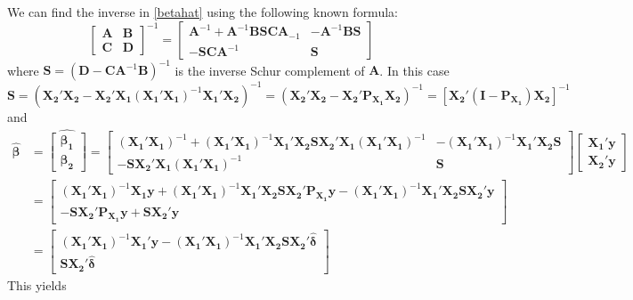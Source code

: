 \documentclass[10pt]{article}
\begin{document}
We can find the inverse in \eqref{betahat} using the following known formula:
\[
\begin{bmatrix} \bm{A} & \bm{B} \\ \bm{C} & \bm{D} \end{bmatrix} ^{-1} =
\begin{bmatrix} \bm{A}^{-1} + \bm{A}^{-1}\bm{B}\bm{S}\bm{C}\bm{A}_{-1}
  & -\bm{A}^{-1}\bm{B}\bm{S} \\
  -\bm{S}\bm{C}\bm{A}^{-1} & \bm{S} \end{bmatrix}
\]
where $\bm{S} = (\bm{D} - \bm{C}\bm{A}^{-1}\bm{B})^{-1}$ is the
inverse Schur complement of $\bm{A}$. In this case
\[
\bm{S} = \left(\bm{X_2}'\bm{X_2} -
  \bm{X_2}'\bm{X_1}(\bm{X_1}'\bm{X_1})^{-1}\bm{X_1}'\bm{X_2}\right)^{-1}
= (\bm{X_2}'\bm{X_2} - \bm{X_2}'\bm{P_{X_1}}\bm{X_2})^{-1} =
\left[\bm{X_2}'(\bm{I} - \bm{P_{X_1}})\bm{X_2}\right]^{-1}
\]
and
\begin{align*}
\bm{\hat{\beta}} &= \widehat{\begin{bmatrix} \bm{\beta_1} \\
    \bm{\beta_2} \end{bmatrix}} =
\begin{bmatrix} (\bm{X_1}'\bm{X_1})^{-1} +
  (\bm{X_1}'\bm{X_1})^{-1}\bm{X_1}'\bm{X_2} \bm{S}
  \bm{X_2}'\bm{X_1}(\bm{X_1}'\bm{X_1})^{-1} &
  -(\bm{X_1}'\bm{X_1})^{-1}\bm{X_1}'\bm{X_2}\bm{S} \\
  -\bm{S}\bm{X_2}'\bm{X_1}(\bm{X_1}'\bm{X_1})^{-1} &
  \bm{S} \end{bmatrix}
\begin{bmatrix} \bm{X_1}'\bm{y}\\ \bm{X_2}'\bm{y}\end{bmatrix} \\
&= \begin{bmatrix} (\bm{X_1}'\bm{X_1})^{-1}\bm{X_1}\bm{y} +
  (\bm{X_1}'\bm{X_1})^{-1}\bm{X_1}'\bm{X_2}\bm{S}\bm{X_2}'\bm{P_{X_1}}\bm{y}
  - (\bm{X_1}'\bm{X_1})^{-1}\bm{X_1}'\bm{X_2}\bm{S}\bm{X_2}'\bm{y} \\
  -\bm{S}\bm{X_2}'\bm{P_{X_1}}\bm{y} +
    \bm{S}\bm{X_2}'\bm{y} \end{bmatrix}\\
&=\begin{bmatrix} (\bm{X_1}'\bm{X_1})^{-1}\bm{X_1}'\bm{y} -
  (\bm{X_1}'\bm{X_1})^{-1}\bm{X_1}'\bm{X_2}\bm{S}\bm{X_2}'\bm{\hat{\delta}}\\
  \bm{S}\bm{X_2}'\bm{\hat{\delta}} \end{bmatrix}
\end{align*}
This yields
\end{document}
